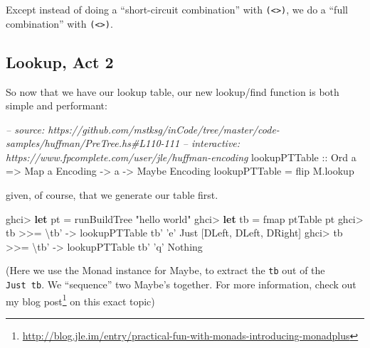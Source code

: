 \documentclass[]{article}
\newenvironment{Shaded}{}{}
\newcommand{\KeywordTok}[1]{\textcolor[rgb]{0.00,0.44,0.13}{\textbf{{#1}}}}
\newcommand{\DataTypeTok}[1]{\textcolor[rgb]{0.56,0.13,0.00}{{#1}}}
\newcommand{\CharTok}[1]{\textcolor[rgb]{0.25,0.44,0.63}{{#1}}}
\newcommand{\StringTok}[1]{\textcolor[rgb]{0.25,0.44,0.63}{{#1}}}
\newcommand{\CommentTok}[1]{\textcolor[rgb]{0.38,0.63,0.69}{\textit{{#1}}}}
\newcommand{\OtherTok}[1]{\textcolor[rgb]{0.00,0.44,0.13}{{#1}}}
\newcommand{\FunctionTok}[1]{\textcolor[rgb]{0.02,0.16,0.49}{{#1}}}
\newcommand{\NormalTok}[1]{{#1}}
\renewcommand{\href}[2]{#2\footnote{\url{#1}}}
\begin{document}
Except instead of doing a ``short-circuit combination'' with
\texttt{(\textless{}\textbar{}\textgreater{})}, we do a ``full
combination'' with \texttt{(\textless{}\textgreater{})}.

\subsection{Lookup, Act 2}\label{lookup-act-2}

So now that we have our lookup table, our new lookup/find function is
both simple and performant:

\begin{Shaded}
\begin{Highlighting}[]
\CommentTok{-- source: https://github.com/mstksg/inCode/tree/master/code-samples/huffman/PreTree.hs#L110-111}
\CommentTok{-- interactive: https://www.fpcomplete.com/user/jle/huffman-encoding}
\OtherTok{lookupPTTable ::} \DataTypeTok{Ord} \NormalTok{a }\OtherTok{=>} \DataTypeTok{Map} \NormalTok{a }\DataTypeTok{Encoding} \OtherTok{->} \NormalTok{a }\OtherTok{->} \DataTypeTok{Maybe} \DataTypeTok{Encoding}
\NormalTok{lookupPTTable }\FunctionTok{=} \NormalTok{flip M.lookup}
\end{Highlighting}
\end{Shaded}

given, of course, that we generate our table first.

\begin{Shaded}
\begin{Highlighting}[]
\NormalTok{ghci}\FunctionTok{>} \KeywordTok{let} \NormalTok{pt }\FunctionTok{=} \NormalTok{runBuildTree }\StringTok{"hello world"}
\NormalTok{ghci}\FunctionTok{>} \KeywordTok{let} \NormalTok{tb }\FunctionTok{=} \NormalTok{fmap ptTable pt}
\NormalTok{ghci}\FunctionTok{>} \NormalTok{tb }\FunctionTok{>>=} \NormalTok{\textbackslash{}tb' }\OtherTok{->} \NormalTok{lookupPTTable tb' }\CharTok{'e'}
\DataTypeTok{Just} \NormalTok{[}\DataTypeTok{DLeft}\NormalTok{, }\DataTypeTok{DLeft}\NormalTok{, }\DataTypeTok{DRight}\NormalTok{]}
\NormalTok{ghci}\FunctionTok{>} \NormalTok{tb }\FunctionTok{>>=} \NormalTok{\textbackslash{}tb' }\OtherTok{->} \NormalTok{lookupPTTable tb' }\CharTok{'q'}
\DataTypeTok{Nothing}
\end{Highlighting}
\end{Shaded}

(Here we use the Monad instance for Maybe, to extract the
\texttt{tb\textquotesingle{}} out of the \texttt{Just\ tb}. We
``sequence'' two Maybe's together. For more information, check out my
\href{http://blog.jle.im/entry/practical-fun-with-monads-introducing-monadplus}{blog
post} on this exact topic)
\end{document}

